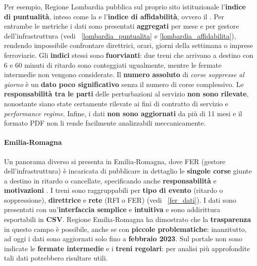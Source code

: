 \documentclass[12pt,italian]{report}
\begin{document}
Per esempio, Regione Lombardia pubblica sul proprio sito istituzionale
\cite{LombardiaDati} l'\textbf{indice di puntualità}, inteso come la
 e
l'\textbf{indice di affidabilità}, ovvero il .  Per entrambe le metriche i
dati sono presentati \textbf{aggregati} per mese e per gestore
dell'infrastruttura (vedi \figurename \ \ref{lombardia_puntualita} e
\ref{lombardia_affidabilita}), rendendo impossibile confrontare
direttrici, orari, giorni della settimana o imprese ferroviarie.  Gli
\textbf{indici} stessi sono \textbf{fuorvianti}: due treni che
arrivano a destino con 6 e 60 minuti di ritardo sono conteggiati
ugualmente, mentre le fermate intermedie non vengono considerate.  Il
\textbf{numero assoluto} di \textit{corse soppresse al giorno} è un
\textbf{dato poco significativo} senza il numero di corse complessivo.
Le \textbf{responsabilità tra le parti} delle perturbazioni al
servizio \textbf{non sono rilevate}, nonostante siano state certamente
rilevate ai fini di contratto di servizio e \textit{performance
    regime}.  Infine, i dati \textbf{non sono aggiornati} da più di 11
mesi e il formato PDF non li rende facilmente analizzabili
meccanicamente.

\paragraph{Emilia-Romagna}
Un panorama diverso si presenta in Emilia-Romagna, dove FER (gestore
dell'infrastruttura) è incaricata di pubblicare in dettaglio le
\textbf{singole corse} giunte a destino in ritardo o cancellate,
specificando anche \textbf{responsabilità} e \textbf{motivazioni}
\cite{FerDati}.  I treni sono raggruppabili per \textbf{tipo di
    evento} (ritardo o soppressione), \textbf{direttrice} e
\textbf{rete} (RFI o FER) (vedi \figurename\ \ref{fer_dati}).  I dati
sono presentati con un'\textbf{interfaccia semplice} e
\textbf{intuitiva} e sono addirittura esportabili in \textbf{CSV}.
Regione Emilia-Romagna ha dimostrato che la \textbf{trasparenza} in
questo campo è possibile, anche se con \textbf{piccole problematiche}:
inanzitutto, ad oggi i dati sono aggiornati solo fino a
\textbf{febbraio 2023}.  Sul portale non sono indicate le
\textbf{fermate intermedie} e i \textbf{treni regolari}: per analisi
più approfondite tali dati potrebbero risultare utili.
\end{document}
